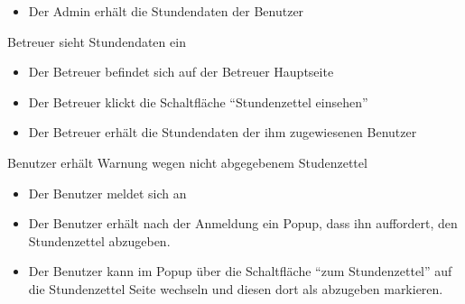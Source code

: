 \begin{requirements}
\begin{itemize}
		\item Der Admin erhält die Stundendaten der Benutzer
	\end {itemize}
	 Betreuer sieht Stundendaten ein
	\begin{itemize}
		\item Der Betreuer befindet sich auf der Betreuer Hauptseite
		\item Der Betreuer klickt die Schaltfläche "`Stundenzettel einsehen"'
		\item Der Betreuer erhält die Stundendaten der ihm zugewiesenen Benutzer
	\end {itemize}
	 Benutzer erhält Warnung wegen nicht abgegebenem Studenzettel
            \begin{itemize}
		\item Der Benutzer meldet sich an
		\item Der Benutzer erhält nach der Anmeldung ein Popup, dass ihn auffordert, den Stundenzettel abzugeben.
		\item Der Benutzer kann im Popup über die Schaltfläche "`zum Stundenzettel"' auf die Stundenzettel Seite wechseln und diesen dort als abzugeben markieren.
	\end {itemize}

\end{requirements}
